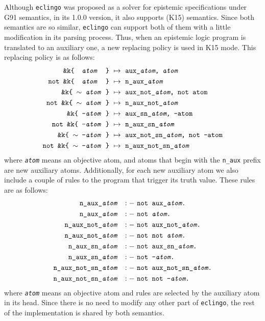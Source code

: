 \documentclass{new_tlp}
\def\eclingo{{\tt eclingo}}
\begin{document}
Although \eclingo{} was proposed as a solver for epistemic specifications under G91 semantics, in its 1.0.0 version, it also supports \cite{kawabagezh15} (K15) semantics.
%
Since both semantics are so similar, \eclingo{} can support both of them with a little modification in its parsing process. Thus, when an epistemic logic program is translated to an auxiliary one, a new replacing policy is used in K15 mode. This replacing policy is as follows:
\begin{align*}
    \texttt{\&k\{ \ \emph{atom} \ \}} \ & \mapsto\ \texttt{aux\_\emph{atom},\ \emph{atom}} \\
    \texttt{not\ \&k\{ \ \emph{atom} \ \}} \ & \mapsto\ \texttt{n\_aux\_\emph{atom}}\\
    \texttt{\&k\{\ $\sim$ \emph{atom}\  \}}\ & \mapsto\ \texttt{aux\_not\_\emph{atom},\ not\ atom} \\
    \texttt{not\ \&k\{\ $\sim$ \emph{atom}\  \}}\ & \mapsto\ \texttt{n\_aux\_not\_\emph{atom}} \\
    \texttt{\&k\{\ {-}\emph{atom}\  \}}\ & \mapsto\ \texttt{aux\_sn\_\emph{atom},\ -atom} \\
    \texttt{not\ \&k\{\ {-}\emph{atom}\  \}}\ & \mapsto\ \texttt{n\_aux\_sn\_\emph{atom}} \\
    \texttt{\&k\{\ $\sim$ {-}\emph{atom}\  \}}\ & \mapsto\ \texttt{aux\_not\_sn\_\emph{atom},\ not\ -atom} \\
    \texttt{not\ \&k\{\ $\sim$ {-}\emph{atom}\  \}}\ & \mapsto\ \texttt{n\_aux\_not\_sn\_\emph{atom}}
\end{align*}
where \texttt{\emph{atom}} means an objective atom, and atoms that begin with the \texttt{n\_aux} prefix are new auxiliary atoms.
%
Additionally, for each new auxiliary atom we also include a couple of rules to the program that trigger its truth value. These rules are as follows:
\begin{align*}
    \texttt{n\_aux\_\emph{atom}} \ &\ :-\ \texttt{not\ aux\_\emph{atom}.} \\
    \texttt{n\_aux\_\emph{atom}} \ &\ :-\ \texttt{not\ \emph{atom}.} \\
    \texttt{n\_aux\_not\_\emph{atom}} \ &\ :-\ \texttt{not\ aux\_not\_\emph{atom}.} \\
    \texttt{n\_aux\_not\_\emph{atom}} \ &\ :-\ \texttt{not\ not\ \emph{atom}.} \\
    \texttt{n\_aux\_sn\_\emph{atom}} \ &\ :-\ \texttt{not\ aux\_sn\_\emph{atom}.} \\
    \texttt{n\_aux\_sn\_\emph{atom}} \ &\ :-\ \texttt{not\ {-}\emph{atom}.} \\
    \texttt{n\_aux\_not\_sn\_\emph{atom}} \ &\ :-\ \texttt{not\ aux\_not\_sn\_\emph{atom}.} \\
    \texttt{n\_aux\_not\_sn\_\emph{atom}} \ &\ :-\ \texttt{not\ not\ {-}\emph{atom}.}
\end{align*}
where \texttt{\emph{atom}} means an objective atom and rules are selected by the auxiliary atom in its head.
%
Since there is no need to modify any other part of \eclingo{}, the rest of the implementation is shared by both semantics.
\end{document}

